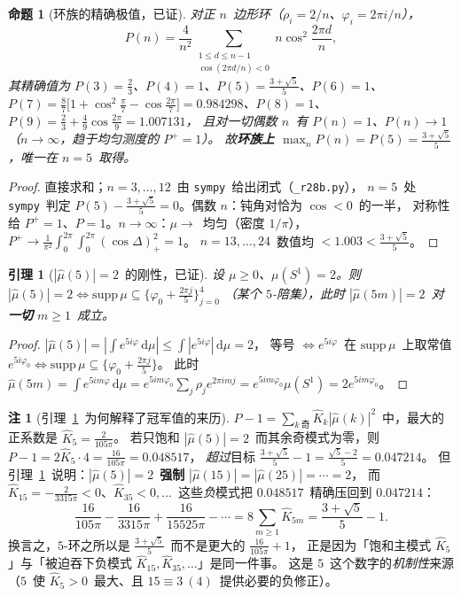 \documentclass[UTF8,11pt]{ctexart}
\newtheorem{proposition}[theorem]{命题}
\newtheorem{lemma}[theorem]{引理}
\theoremstyle{definition}
\newtheorem{remark}[theorem]{注}
\newcommand{\dd}{\,\mathrm{d}}
\begin{document}
\begin{proposition}[环族的精确极值，已证]\label{prop:r28ring}
对正 $n$~边形环（$\rho_i=2/n$、$\varphi_i=2\pi i/n$），
\[
P(n)=\frac4{n^2}\!\!\sum_{\substack{1\le d\le n-1\\ \cos(2\pi d/n)<0}}\!\!n\cos^2\frac{2\pi d}n,
\]
其精确值为 $P(3)=\frac23$、$P(4)=1$、$P(5)=\frac{3+\sqrt5}5$、$P(6)=1$、
$P(7)=\frac87\bigl[1+\cos^2\frac\pi7-\cos\frac{2\pi}7\bigr]=0.984298$、$P(8)=1$、$P(9)=\frac23+\frac49\cos\frac{2\pi}9=1.007131$，
且对一切偶数 $n$~有 $P(n)=1$、$P(n)\to1$（$n\to\infty$，趋于均匀测度的 $P^+=1$）。
故\textbf{环族上 $\max_nP(n)=P(5)=\frac{3+\sqrt5}5$}，唯一在 $n=5$~取得。
\end{proposition}

\begin{proof}
直接求和；$n=3,\dots,12$~由 \texttt{sympy}~给出闭式（\texttt{\_r28b.py}），
$n=5$~处 \texttt{sympy}~判定 $P(5)-\frac{3+\sqrt5}5=0$。偶数 $n$：钝角对恰为 $\cos<0$~的一半，
对称性给 $P^+=1$、$P=1$。$n\to\infty$：$\mu\to$~均匀（密度 $1/\pi$），
$P^+\to\frac1{\pi^2}\int_0^{2\pi}\!\!\int_0^{2\pi}(\cos\Delta)_+^2=1$。
$n=13,\dots,24$~数值均 $<1.003<\frac{3+\sqrt5}5$。
\end{proof}

\begin{lemma}[$|\widehat\mu(5)|=2$~的刚性，已证]\label{lem:r28rigid5}
设 $\mu\ge0$、$\mu(S^1)=2$。则 $|\widehat\mu(5)|=2\iff\mathrm{supp}\,\mu\subseteq\{\varphi_0+\tfrac{2\pi j}5\}_{j=0}^4$
（某个 $5$-陪集），此时 $|\widehat\mu(5m)|=2$~对\textbf{一切} $m\ge1$~成立。
\end{lemma}

\begin{proof}
$|\widehat\mu(5)|=|\int e^{5i\varphi}\dd\mu|\le\int|e^{5i\varphi}|\dd\mu=2$，
等号 $\iff e^{5i\varphi}$~在 $\mathrm{supp}\,\mu$~上取常值 $e^{5i\varphi_0}\iff\mathrm{supp}\,\mu\subseteq\{\varphi_0+\frac{2\pi j}5\}$。
此时 $\widehat\mu(5m)=\int e^{5im\varphi}\dd\mu=e^{5im\varphi_0}\sum_j\rho_je^{2\pi imj}=e^{5im\varphi_0}\mu(S^1)=2e^{5im\varphi_0}$。
\end{proof}

\begin{remark}[引理~\ref{lem:r28rigid5}~为何解释了冠军值的来历]\label{rem:r28why5}
$P-1=\sum_{k\ \text{奇}}\widehat K_k|\widehat\mu(k)|^2$~中，最大的正系数是 $\widehat K_5=\frac2{105\pi}$。
若只饱和 $|\widehat\mu(5)|=2$~而其余奇模式为零，则 $P-1=2\widehat K_5\cdot4=\frac{16}{105\pi}=0.048517$，
\emph{超过}目标 $\frac{3+\sqrt5}5-1=\frac{\sqrt5-2}5=0.047214$。
但引理~\ref{lem:r28rigid5}~说明：$|\widehat\mu(5)|=2$~\textbf{强制} $|\widehat\mu(15)|=|\widehat\mu(25)|=\cdots=2$，
而 $\widehat K_{15}=-\frac2{3315\pi}<0$、$\widehat K_{35}<0,\dots$~这些\emph{负}模式把
$0.048517$~精确压回到 $0.047214$：
\[
\frac{16}{105\pi}-\frac{16}{3315\pi}+\frac{16}{15525\pi}-\cdots
=8\sum_{m\ge1}\widehat K_{5m}=\frac{3+\sqrt5}5-1 .
\]
换言之，$5$-环之所以是 $\frac{3+\sqrt5}5$~而不是更大的 $\frac{16}{105\pi}+1$，
正是因为「饱和主模式 $\widehat K_5$」与「被迫吞下负模式 $\widehat K_{15},\widehat K_{35},\dots$」是同一件事。
这是 $5$~这个数字的\emph{机制性}来源（$5$~使 $\widehat K_5>0$~最大、且 $15\equiv3\ (4)$~提供必要的负修正）。
\end{remark}
\end{document}

